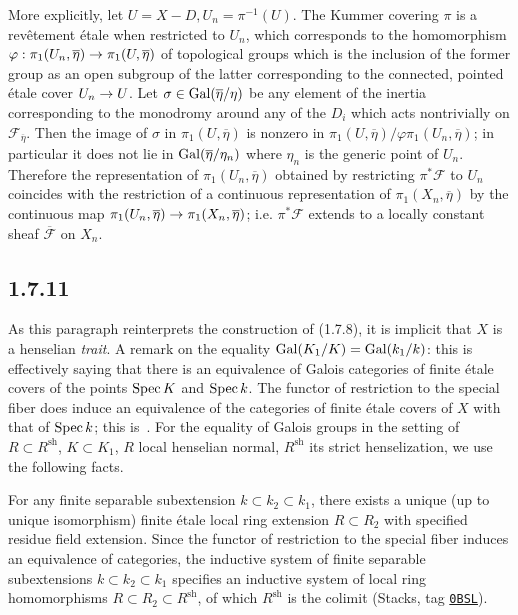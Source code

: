 \documentclass[deligne.tex]{subfiles}
\begin{document}
More explicitly, let $U=X-D,U_n=\pi^{-1}(U)$. The Kummer covering $\pi$ is a
revêtement étale when restricted to $U_n$, which corresponds to the
homomorphism $\varphi:\pi_1(U_n,\overline\eta)\rightarrow\pi_1(U,\overline\eta)$ of
topological groups which is the inclusion of the former group as an open
subgroup of the latter corresponding to the connected, pointed étale cover 
$U_n\rightarrow U$. Let $\sigma\in\operatorname{Gal}(\overline\eta/\eta)$ be any element of the
inertia corresponding to the monodromy around any of the $D_i$ which acts
nontrivially on $\mathscr F_{\overline\eta}$. Then the image of $\sigma$ in
$\pi_1(U,\overline\eta)$ is nonzero in
$\pi_1(U,\overline\eta)/\varphi\pi_1(U_n,\overline\eta)$; in particular it
does not lie in $\operatorname{Gal}(\overline\eta/\eta_n)$ where $\eta_n$ is the generic
point of $U_n$. Therefore the representation of $\pi_1(U_n,\overline\eta)$
obtained by restricting $\pi^\ast\mathscr F$ to $U_n$ coincides with the
restriction of a continuous representation of $\pi_1(X_n,\overline\eta)$
by the continuous map $\pi_1(U_n,\overline\eta)\rightarrow\pi_1(X_n,\overline\eta)$;
i.e. $\pi^\ast\mathscr F$ extends to a locally constant sheaf
$\overline{\mathscr F}$ on $X_n$.

\subsection*{1.7.11}\label{weilii:1.7.11}
As this paragraph reinterprets the construction of (1.7.8), it is implicit
that $X$ is a henselian \emph{trait}.
A remark on the equality $\operatorname{Gal}(K_1/K)=\operatorname{Gal}(k_1/k)$: this is effectively
saying that there is an equivalence of Galois categories of finite étale
covers of the points $\operatorname{Spec} K$ and $\operatorname{Spec} k$.
The functor of restriction to the special fiber does induce an
equivalence of the categories of finite étale covers of $X$ with that of
$\operatorname{Spec} k$; this is~\cite[$\text{IV}_{\text 4}$ 18.5.11]{EGA}. For the
equality of Galois groups in the setting of $R\subset R^{\text{sh}}$,
$K\subset K_1$, $R$ local henselian normal, $R^{\text{sh}}$ its strict
henselization, we use the following facts.
	
	For any finite separable subextension $k\subset k_2\subset k_1$,
	there exists a unique (up to unique isomorphism) finite étale local
	ring extension $R\subset R_2$ with specified residue field extension.
	Since the functor of restriction to the special fiber induces an
	equivalence of categories, the inductive system of finite separable 
	subextensions $k\subset k_2\subset k_1$ specifies an inductive system of 
	local ring homomorphisms $R\subset R_2\subset R^{\text{sh}}$, of which
	$R^{\text{sh}}$ is the colimit (Stacks, tag
	\texttt{\href{https://stacks.math.columbia.edu/tag/0BSL}{0BSL}}).
	
\end{document}

